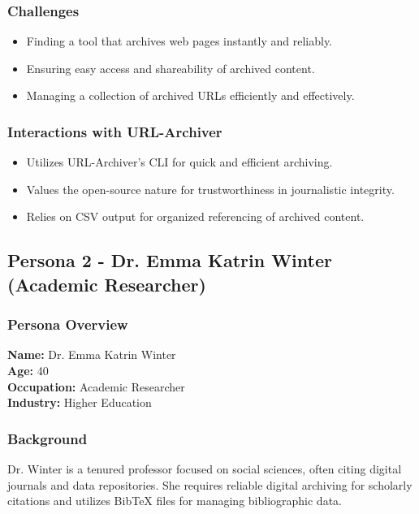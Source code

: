 \subsubsection{Challenges}
\begin{itemize}
    \item Finding a tool that archives web pages instantly and reliably.
    \item Ensuring easy access and shareability of archived content.
    \item Managing a collection of archived URLs efficiently and effectively.
\end{itemize}

\subsubsection{Interactions with URL-Archiver}
\begin{itemize}
    \item Utilizes URL-Archiver's CLI for quick and efficient archiving.
    \item Values the open-source nature for trustworthiness in journalistic integrity.
    \item Relies on CSV output for organized referencing of archived content.
\end{itemize}

\clearpage
\subsection{Persona 2 - Dr. Emma Katrin Winter (Academic Researcher)}

\subsubsection{Persona Overview}

\textbf{Name:} Dr. Emma Katrin Winter \\
\textbf{Age:} 40 \\
\textbf{Occupation:} Academic Researcher \\
\textbf{Industry:} Higher Education

\subsubsection{Background}
Dr. Winter is a tenured professor focused on social sciences, often citing digital journals and data repositories.
She requires reliable digital archiving for scholarly citations and utilizes BibTeX files for managing bibliographic data.

